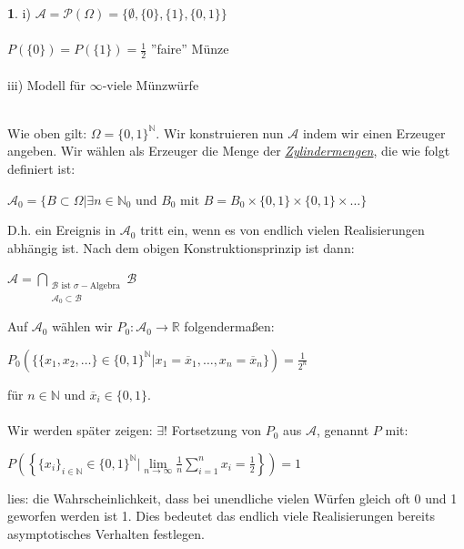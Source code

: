 \documentclass[10pt,a4paper]{report}
\numberwithin{equation}{section}
\numberwithin{figure}{section}
\theoremstyle{plain}
\theoremstyle{definition}
\theoremstyle{plain}
\theoremstyle{definition}
\newtheorem{example}{\protect\examplename}[section]
\theoremstyle{remark}
\theoremstyle{plain}
\theoremstyle{plain}
\theoremstyle{plain}
\theoremstyle{plain}
\theoremstyle{plain}
\providecommand{\examplename}{Beispiel}
\newcommand{\1}{ \mathbb{1} } %
\begin{document}
\begin{example}
  i) $\mathcal{A}=\mathcal{P}(\Omega)=\{\emptyset,\{0\},\{1\},\{0,1\}\}$\\\\
  \qquad $P(\{0\})=P(\{1\})=\frac{1}{2}$ \qquad ''faire'' Münze\\\\
  iii) Modell für $\infty$-viele Münzwürfe\\\\
\end{example}
Wie oben gilt: $\Omega=\{0,1\}^\mathbb{N}$. Wir konstruieren nun $\mathcal{A}$ indem wir einen Erzeuger angeben. Wir wählen als Erzeuger die Menge der \textit{\underline{Zylindermengen}}, die wie folgt definiert ist:
\begin{center}
$\mathcal{A}_0=\{B\subset \Omega|\exists n \in \mathbb{N}_0 \text{ und } B_0 \text{ mit } B=B_0\times\{0,1\}\times \{0,1\}\times\dots \} $
\end{center}
D.h. ein Ereignis in $\mathcal{A}_0$ tritt ein, wenn es von endlich vielen Realisierungen abhängig ist. Nach dem obigen Konstruktionsprinzip ist dann:
\begin{center}
$\mathcal{A}=\bigcap\limits_{\substack{\mathcal{B} \text{ ist }  \sigma-\text{Algebra}\\ \mathcal{A}_0\subset \mathcal{B}}}\mathcal{B}$
\end{center}       
Auf $\mathcal{A}_0$ wählen wir $P_0: \mathcal{A}_0 \to \mathbb{R}$ folgendermaßen:
\begin{center}
$P_0(\{\{x_1,x_2,\dots\}\in \{0,1\}^\mathbb{N}|x_1=\overline{x}_1,\dots,x_n=\overline{x}_n\})=\frac{1}{2^n}$
\end{center}
für $n \in \mathbb{N}$ und $\overline{x}_i \in \{0,1\}$.\\\\
Wir werden später zeigen: $\exists !$ Fortsetzung von $P_0$ aus $\mathcal{A}$, genannt $P$ mit:\begin{center}
$P\left(\left\{\{x_i\}_{i \in \mathbb{N}} \in \{0,1\}^\mathbb{N}| \lim\limits_{n \to \infty} \frac{1}{n}\sum\limits_{i=1}^n x_i=\frac{1}{2}\right\}\right)=1$
\end{center}
lies: die Wahrscheinlichkeit, dass bei unendliche vielen Würfen gleich oft 0 und 1 geworfen werden ist 1. Dies bedeutet das endlich viele Realisierungen bereits asymptotisches Verhalten festlegen.\\\\\\
\end{document}

